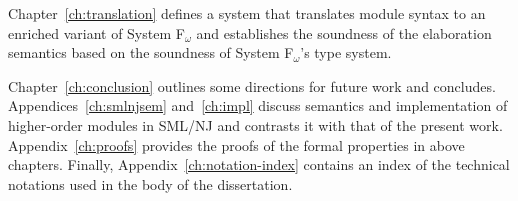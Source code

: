 Chapter~\ref{ch:translation} defines a system that translates module syntax to an enriched variant of System F$_\omega$ and establishes the soundness of the elaboration semantics based on the soundness of System F$_\omega$'s type system. 

Chapter~\ref{ch:conclusion} outlines some directions for future work and concludes. Appendices~\ref{ch:smlnjsem} and~\ref{ch:impl} discuss semantics and implementation of higher-order modules in SML/NJ and contrasts it with that of the present work. Appendix~\ref{ch:proofs} provides the proofs of the formal properties in above chapters. Finally, Appendix~\ref{ch:notation-index} contains an index of the technical notations used in the body of the dissertation.




